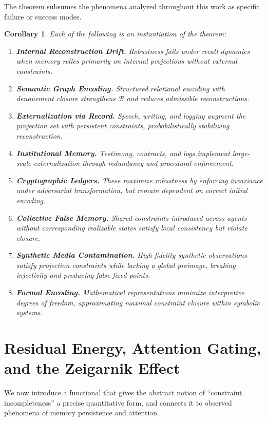 \documentclass[12pt, letterpaper]{article}
\theoremstyle{flyxion}
\newtheorem{corollary}[theorem]{Corollary}
\begin{document}
The theorem subsumes the phenomena analyzed throughout this work as specific failure or success modes.

\begin{corollary}
Each of the following is an instantiation of the theorem:
\begin{enumerate}
\item \textbf{Internal Reconstruction Drift.} Robustness fails under recall dynamics when memory relies primarily on internal projections without external constraints.
\item \textbf{Semantic Graph Encoding.} Structured relational encoding with denouement closure strengthens $\mathcal{R}$ and reduces admissible reconstructions.
\item \textbf{Externalization via Record.} Speech, writing, and logging augment the projection set with persistent constraints, probabilistically stabilizing reconstruction.
\item \textbf{Institutional Memory.} Testimony, contracts, and logs implement large-scale externalization through redundancy and procedural enforcement.
\item \textbf{Cryptographic Ledgers.} These maximize robustness by enforcing invariance under adversarial transformation, but remain dependent on correct initial encoding.
\item \textbf{Collective False Memory.} Shared constraints introduced across agents without corresponding realizable states satisfy local consistency but violate closure.
\item \textbf{Synthetic Media Contamination.} High-fidelity synthetic observations satisfy projection constraints while lacking a global preimage, breaking injectivity and producing false fixed points.
\item \textbf{Formal Encoding.} Mathematical representations minimize interpretive degrees of freedom, approximating maximal constraint closure within symbolic systems.
\end{enumerate}
\end{corollary}

\section{Residual Energy, Attention Gating, and the Zeigarnik Effect}

We now introduce a functional that gives the abstract notion of ``constraint incompleteness'' a precise quantitative form, and connects it to observed phenomena of memory persistence and attention.
\end{document}
